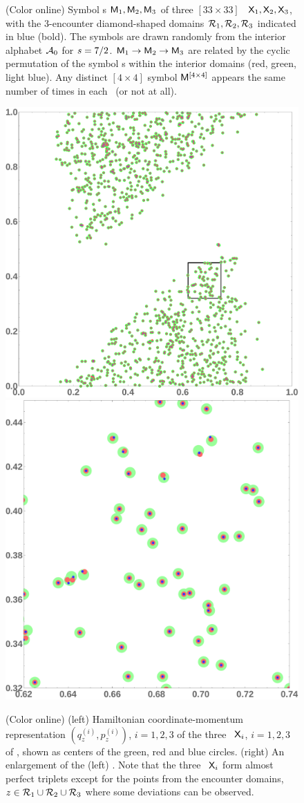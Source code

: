 \documentclass[12pt]{iopart}
\begin{document}
\begin{figure}
\begin{center}
    \end{center}
\caption[]{
(Color online)
Symbol \brick s $\mathsf{M}_1, \mathsf{M}_2, \mathsf{M}_3$ of three $[33\times33]$ \twots\
$\mathsf{X}_1, \mathsf{X}_2, \mathsf{X}_3$, with the 3-encounter diamond-shaped
domains $\mathcal{R}_1, \mathcal{R}_2, \mathcal{R}_3$  indicated in blue (bold). The symbols are
drawn randomly from the interior alphabet $\mathcal{A}_0$ for $s=7/2$.
$\mathsf{M}_1\to\mathsf{M}_2\to\mathsf{M}_3$ are related by the cyclic permutation of the
symbol \brick s  within  the interior domains (red, green, light  blue).
Any distinct $[4\!\times\!4]$ symbol {\brick} $\mathsf{M}^{[4\times 4]}$ appears
the same number of times in each \twot\ (or not at all).
        }
\label{fig:AKSs13TwoBlock2}
\end{figure}

\begin{figure}
\begin{center}
\includegraphics[height=0.48\textwidth]
{AKSs7ThreeDiamondsG1}
   \includegraphics[height=0.48\textwidth]
{AKSs7ThreeDiamondsG2}
\end{center}
\caption[]{\label{fig:AKSs13TwoBlocks1}
(Color online)
(left) Hamiltonian coordinate-\-momentum representation $(q^{(i)}_z,p^{(i)}_z)$,
$i=1,2,3$
of the three \twots\  $\mathsf{X}_i$,
$i=1,2,3$  of ,
shown as centers of the green, red and blue circles. (right)
An enlargement of the (left) \statesp.  Note that the three \twots\ $\mathsf{X}_i$
form almost perfect triplets except for the points
from the encounter domains, $z\in \mathcal{R}_1\cup\mathcal{R}_2\cup\mathcal{R}_3$  where some
deviations can be  observed.
        }
\end{figure}
\end{document}
